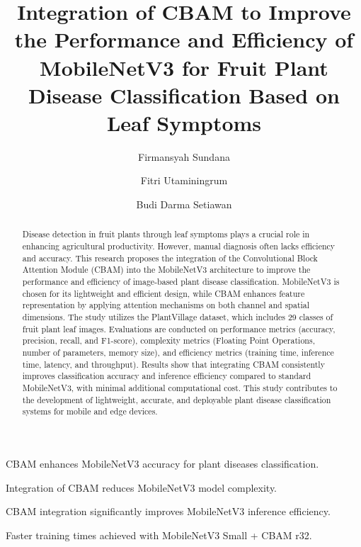 \documentclass[preprint,12pt]{elsarticle}
\begin{document}
\begin{frontmatter}


\title{Integration of CBAM to Improve the Performance and Efficiency of MobileNetV3 for Fruit Plant Disease Classification Based on Leaf Symptoms}


\author[1]{Firmansyah Sundana} %
\author[1]{Fitri Utaminingrum} %
\author[1]{Budi Darma Setiawan} %


\begin{abstract}
Disease detection in fruit plants through leaf symptoms plays a crucial role in enhancing agricultural productivity. However, manual diagnosis often lacks efficiency and accuracy. This research proposes the integration of the Convolutional Block Attention Module (CBAM) into the MobileNetV3 architecture to improve the performance and efficiency of image-based plant disease classification. MobileNetV3 is chosen for its lightweight and efficient design, while CBAM enhances feature representation by applying attention mechanisms on both channel and spatial dimensions. The study utilizes the PlantVillage dataset, which includes 29 classes of fruit plant leaf images. Evaluations are conducted on performance metrics (accuracy, precision, recall, and F1-score), complexity metrics (Floating Point Operations, number of parameters, memory size), and efficiency metrics (training time, inference time, latency, and throughput). Results show that integrating CBAM consistently improves classification accuracy and inference efficiency compared to standard MobileNetV3, with minimal additional computational cost. This study contributes to the development of lightweight, accurate, and deployable plant disease classification systems for mobile and edge devices.
\end{abstract}

\begin{graphicalabstract}
\end{graphicalabstract}

\begin{highlights}
\item CBAM enhances MobileNetV3 accuracy for plant diseases classification.
\item Integration of CBAM reduces MobileNetV3 model complexity.
\item CBAM integration significantly improves MobileNetV3 inference efficiency.
\item Faster training times achieved with MobileNetV3 Small + CBAM r32.
\end{highlights}


\end{frontmatter}
\end{document}
